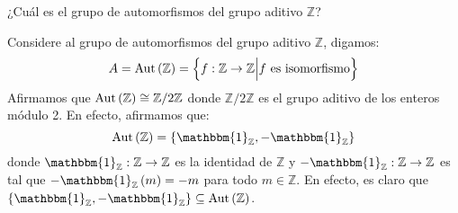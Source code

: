 \documentclass[12pt]{report}
\newcounter{it}
\theoremstyle{largebreak}
\newcommand\cf[3]{\ensuremath{#1:#2\rightarrow#3}}
\newcommand{\bbm}[1]{\ensuremath{\mathbbm{#1}}}
\newcommand{\Aut}[1]{\ensuremath{\textup{Aut}\left(#1\right)}}
\begin{document}
    \begin{excer}
        ¿Cuál es el grupo de automorfismos del grupo aditivo $\mathbb{Z}$?
    \end{excer}

    \begin{sol}
        Considere al grupo de automorfismos del grupo aditivo $\mathbb{Z}$, digamos:
        \begin{equation*}
            A=\Aut{\mathbb{Z}}=\left\{\cf{f}{\mathbb{Z}}{\mathbb{Z}}\Big|f\textup{ es isomorfismo} \right\}
        \end{equation*}
        Afirmamos que $\Aut{\mathbb{Z}}\cong\mathbb{Z}/2\mathbb{Z}$ donde $\mathbb{Z}/2\mathbb{Z}$ es el grupo aditivo de los enteros módulo 2. En efecto, afirmamos que:
        \begin{equation*}
            \Aut{\mathbb{Z}}=\left\{\bbm{1}_{\mathbb{Z}},-\bbm{1}_{\mathbb{Z}}\right\}
        \end{equation*}
        donde $\cf{\bbm{1}_{\mathbb{Z}}}{\mathbb{Z}}{\mathbb{Z}}$ es la identidad de $\mathbb{Z}$ y $\cf{-\bbm{1}_{\mathbb{Z}}}{\mathbb{Z}}{\mathbb{Z}}$ es tal que $-\bbm{1}_{\mathbb{Z}}\left(m\right)=-m$ para todo $m\in\mathbb{Z}$. En efecto, es claro que $\left\{\bbm{1}_{\mathbb{Z}},-\bbm{1}_{\mathbb{Z}}\right\}\subseteq\Aut{\mathbb{Z}}$.


\end{sol}
\end{document}
